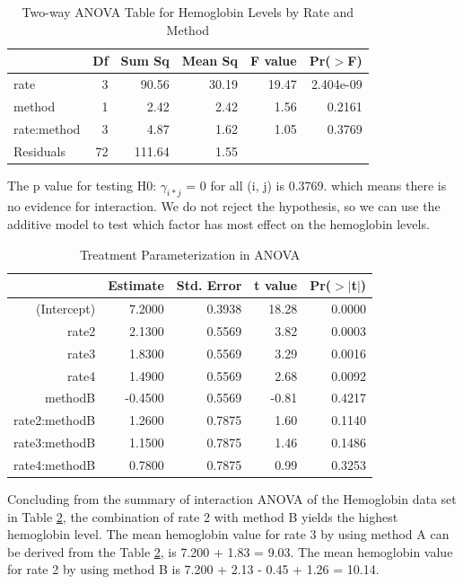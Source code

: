 \documentclass{article}
\begin{document}
\begin{table}[ht]
\centering
\caption{Two-way ANOVA Table for Hemoglobin Levels by Rate and Method} 
\label{tab:hemoglobin_anova}
\begin{tabular}{lrrrrr}
  \hline
 & Df & Sum Sq & Mean Sq & F value & Pr($>$F) \\ 
  \hline
rate & 3 & 90.56 & 30.19 & 19.47 & 2.404e-09 \\ 
  method & 1 & 2.42 & 2.42 & 1.56 & 0.2161 \\ 
  rate:method & 3 & 4.87 & 1.62 & 1.05 & 0.3769 \\ 
  Residuals & 72 & 111.64 & 1.55 &  &  \\ 
   \hline
\end{tabular}
\end{table}

The p value for testing H0: $\gamma_{i*j}$ = 0 for all (i, j) is 0.3769. which means there is no evidence for interaction. We do not reject the hypothesis, so we can use the additive model to test which factor has most effect on the hemoglobin levels. 

\begin{table}[ht]
\caption{Treatment Parameterization in ANOVA}
\label{tab:treatment}
\centering
\begin{tabular}{rrrrr}
  \hline
 & Estimate & Std. Error & t value & Pr($>$$|$t$|$) \\ 
  \hline
(Intercept) & 7.2000 & 0.3938 & 18.28 & 0.0000 \\ 
  rate2 & 2.1300 & 0.5569 & 3.82 & 0.0003 \\ 
  rate3 & 1.8300 & 0.5569 & 3.29 & 0.0016 \\ 
  rate4 & 1.4900 & 0.5569 & 2.68 & 0.0092 \\ 
  methodB & -0.4500 & 0.5569 & -0.81 & 0.4217 \\ 
  rate2:methodB & 1.2600 & 0.7875 & 1.60 & 0.1140 \\ 
  rate3:methodB & 1.1500 & 0.7875 & 1.46 & 0.1486 \\ 
  rate4:methodB & 0.7800 & 0.7875 & 0.99 & 0.3253 \\ 
   \hline
\end{tabular}
\end{table}

Concluding from the summary of interaction ANOVA of the Hemoglobin data set in Table \ref{tab:treatment}, the combination of rate 2 with method B yields the highest hemoglobin level. The mean hemoglobin value for rate 3 by using method A can be derived from the Table \ref{tab:treatment}, is 7.200 + 1.83 = 9.03. The mean hemoglobin value for rate 2 by using method B is 7.200 + 2.13 - 0.45 + 1.26 = 10.14.
\end{document}
